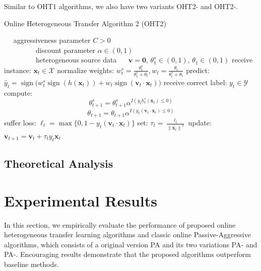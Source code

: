 \documentclass[letterpaper]{article}
\DeclareMathOperator{\sign}{sign}
\begin{document}
Similar to OHT1 algorithms, we also have two variants OHT2-\uppercase\expandafter{} and OHT2-\uppercase\expandafter{}.

\begin{algorithm}
\begin{algorithmic}[1]
\caption{Online Heterogeneous Transfer Algorithm 2 (OHT2)}
\REQUIRE ~~
aggressiveness parameter $C>0$\\ 
~~~~~~~~~discount parameter $\alpha \in (0,1)$\\ 
~~~~~~~~~heterogeneous source data
\ENSURE ~~
$\mathbf{v} = \mathbf{0}$, $\theta_{1}^{s} \in (0,1)$, $\theta_{1} \in (0,1)$
\STATE 
  receive instance: $\mathbf{x}_t \in \mathcal{X}$
\STATE
  normalize weights: $w_{t}^{s} = \frac{\theta_{t}^{s}}{\theta_{t}^{s}+\theta_t}, w_{t} = \frac{\theta_{t}}{\theta_{t}^{s}+\theta_t}$
\STATE
  predict: $\hat{y}_t = \sign \big( w_{t}^{s} \sign (h(\mathbf{x}_t)) + w_{t} \sign (\mathbf{v}_t \cdot \mathbf{x}_t) \big)$
\STATE
  receive correct label: $y_t \in \mathcal{Y}$
\STATE
  compute: 
    $$\theta_{t+1}^{s} = \theta_{t+1}^{s} \alpha ^ {I(y_t h_{t}^{s}(\mathbf{x}_t) \leq 0)}  $$
    $$\theta_{t+1} = \theta_{t+1} \alpha ^ {I(y_t (\mathbf{v}_t \cdot \mathbf{x}_t) \leq 0)}  $$
\STATE
  suffer loss: $\ell_t = \max \{0, 1-y_t(\mathbf{v}_t \cdot \mathbf{x}_t)\}$
\STATE
  set: $\tau_t = \frac{\ell_t}{{\|\mathbf{x}_t\|}^2}$
\STATE
  update: $ \mathbf{v}_{t+1} = \mathbf{v}_t + \tau_t y_t \mathbf{x}_t $
\ENDFOR
\end{algorithmic}
\end{algorithm}


\subsection{Theoretical Analysis}

\section{Experimental Results}

In this section, we empirically evaluate the performance of proposed online heterogeneous transfer learning algorithms and classic online Passive-Aggressive algorithms, which consists of a original version PA and its two variations PA-\uppercase\expandafter{} and PA-\uppercase\expandafter{}.
Encouraging results demonstrate that the proposed algorithms outperform baseline methods.

\end{document}
